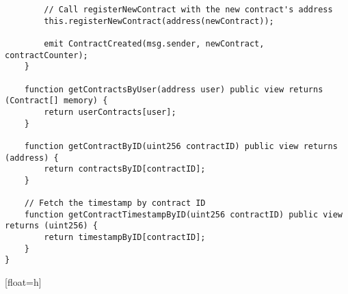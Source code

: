 \begin{lstlisting}
        // Call registerNewContract with the new contract's address
        this.registerNewContract(address(newContract));

        emit ContractCreated(msg.sender, newContract, contractCounter);
    }

    function getContractsByUser(address user) public view returns (Contract[] memory) {
        return userContracts[user];
    }

    function getContractByID(uint256 contractID) public view returns (address) {
        return contractsByID[contractID];
    }

    // Fetch the timestamp by contract ID
    function getContractTimestampByID(uint256 contractID) public view returns (uint256) {
        return timestampByID[contractID];
    }
}

\end{lstlisting}[float=h]



\lstset{
  basicstyle=\footnotesize\ttfamily,
  breaklines=true,
  numbers=left,
  firstnumber=1,
}


